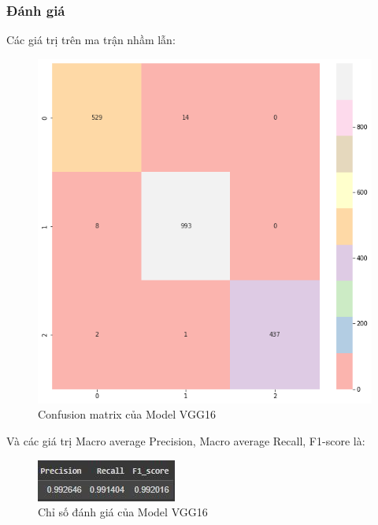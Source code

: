 \subsubsection{Đánh giá}
Các giá trị trên ma trận nhầm lẫn:
\begin{center}
    \begin{figure}[!h]
        \centering
        \includegraphics[scale = 0.4]{fileanh/22.png}
        \caption{Confusion matrix của Model VGG16}
    \end{figure}
\end{center}
Và các giá trị Macro average Precision, Macro average Recall, F1-score là:
\begin{center}
    \begin{figure}[!h]
        \centering
        \includegraphics[scale = 2]{fileanh/23.jpg}
        \caption{Chỉ số đánh giá của Model VGG16}
    \end{figure}
\end{center}

    
